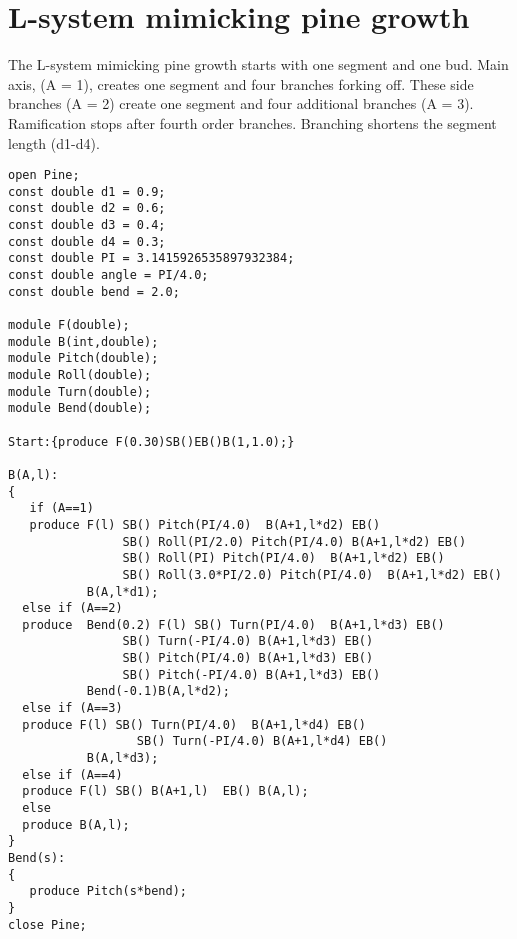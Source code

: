 \section{L-system mimicking pine growth}\label{sec:L1}
The L-system  mimicking pine  growth starts with  one segment  and one
bud.   Main axis, (A  = 1),  creates one  segment and  four branches
forking off.   These side  branches (A =  2) create one  segment and
four additional  branches (A = 3).  Ramification  stops after fourth
order branches. Branching shortens the segment length (d1-d4).

\begin{verbatim}
open Pine;
const double d1 = 0.9;
const double d2 = 0.6;
const double d3 = 0.4;
const double d4 = 0.3;
const double PI = 3.1415926535897932384;
const double angle = PI/4.0;
const double bend = 2.0;

module F(double);
module B(int,double);
module Pitch(double);
module Roll(double);
module Turn(double);
module Bend(double);

Start:{produce F(0.30)SB()EB()B(1,1.0);}

B(A,l):
{
   if (A==1)
   produce F(l) SB() Pitch(PI/4.0)  B(A+1,l*d2) EB() 
                SB() Roll(PI/2.0) Pitch(PI/4.0) B(A+1,l*d2) EB()
                SB() Roll(PI) Pitch(PI/4.0)  B(A+1,l*d2) EB() 
                SB() Roll(3.0*PI/2.0) Pitch(PI/4.0)  B(A+1,l*d2) EB()
           B(A,l*d1);
  else if (A==2)
  produce  Bend(0.2) F(l) SB() Turn(PI/4.0)  B(A+1,l*d3) EB() 
                SB() Turn(-PI/4.0) B(A+1,l*d3) EB()
                SB() Pitch(PI/4.0) B(A+1,l*d3) EB()
                SB() Pitch(-PI/4.0) B(A+1,l*d3) EB()
           Bend(-0.1)B(A,l*d2);
  else if (A==3)
  produce F(l) SB() Turn(PI/4.0)  B(A+1,l*d4) EB() 
                  SB() Turn(-PI/4.0) B(A+1,l*d4) EB()
           B(A,l*d3);
  else if (A==4)
  produce F(l) SB() B(A+1,l)  EB() B(A,l);
  else
  produce B(A,l);          
}
Bend(s):
{
   produce Pitch(s*bend);
}
close Pine;

\end{verbatim}
